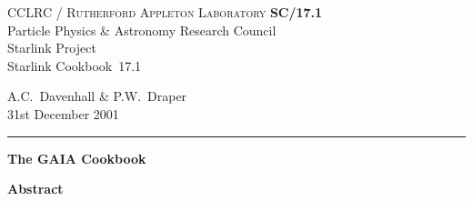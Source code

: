 \documentclass[twoside,11pt]{article}
\newcommand{\stardoccategory}  {Starlink Cookbook}
\newcommand{\stardocinitials}  {SC}
\newcommand{\stardocnumber}    {17.1}
\newcommand{\stardocauthors}   {A.C.~Davenhall \& P.W.~Draper}
\newcommand{\stardocdate}      {31st December 2001}
\newcommand{\stardoctitle}     {The GAIA Cookbook}
\newcommand{\stardocname}{\stardocinitials /\stardocnumber}
\newenvironment{latexonly}{}{}
\renewcommand{\_}{\texttt{\symbol{95}}}
\begin{document}
\thispagestyle{empty}

\begin{latexonly}
   CCLRC / \textsc{Rutherford Appleton Laboratory} \hfill \textbf{\stardocname}\\
   {\large Particle Physics \& Astronomy Research Council}\\
   {\large Starlink Project\\}
   {\large \stardoccategory\ \stardocnumber}
   \begin{flushright}
   \stardocauthors\\
   \stardocdate
   \end{flushright}
   \vspace{-4mm}
   \rule{\textwidth}{0.5mm}
   \vspace{5mm}
   \begin{center}
   {\Huge\textbf{\stardoctitle \\ [2.5ex]}}
   \end{center}
   \vspace{5mm}


   \vspace{10mm}
   \begin{center}
      {\Large\textbf{Abstract}}
   \end{center}
\end{latexonly}
\end{document}
